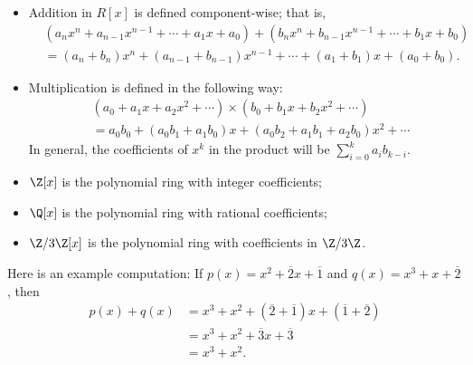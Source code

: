 \begin{itemize}
    \item Addition in \( R[x] \) is defined component-wise; that is,
        \begin{align*}
        &({a}_{n}x^{n} + {a}_{n-1}x^{n-1} + \cdots + {a}_{1}x + {a}_{0}) + ({b}_{n}x^{n} + {b}_{n-1} x^{n-1} + \cdots + {b}_{1}x + {b}_{0}) \\
        &= ({a}_{n} + {b}_{n}) x^{n} + ({a}_{n-1} + {b}_{n-1}) x^{n-1} + \cdots + ({a}_{1} + {b}_{1}) x + ({a}_{0} + {b}_{0}).
        \end{align*}
    \item Multiplication is defined in the following way: 
        \begin{align*}
            &({a}_{0} + {a}_{1}x + {a}_{2} x^{2} + \cdots ) \times ({b}_{0} + {b}_{1}x + {b}_{2} x^{2} + \cdots ) \\
            &= {a}_{0} {b}_{0} + ({a}_{0} {b}_{1} + {a}_{1} {b}_{0})x + ({a}_{0} {b}_{2} + {a}_{1} {b}_{1} + {a}_{2}{b}_{0}) x^{2} + \cdots 
        \end{align*}
        In general, the coefficients of \( x^{k} \) in the product will be \( \displaystyle \sum_{ i = 0 }^{ k  } {a}_{i} {b}_{k-i}  \).
\end{itemize}

\begin{eg}
   \begin{itemize}
       \item \( \Z[x] \) is the polynomial ring with integer coefficients;
       \item \( \Q[x] \) is the polynomial ring with rational coefficients;
       \item \( \Z / 3\Z  [x]   \) is the polynomial ring with coefficients in \( \Z / 3 \Z  \).
   \end{itemize} 
   Here is an example computation: If \( p(x) = x^{2} + \overline{2} x + \overline{1} \) and \( q(x) = x^{3} + x + \overline{2} \), then
   \begin{align*}
       p(x) + q(x) &= x^{3} + x^{2} + (\overline{2} + \overline{1}) x + (\overline{1}+ \overline{2}) \\
                   &= x^{3} + x^{2} + \overline{3} x + \overline{3} \\
                   &= x^{3} + x^{2}.
   \end{align*}
\end{eg}

